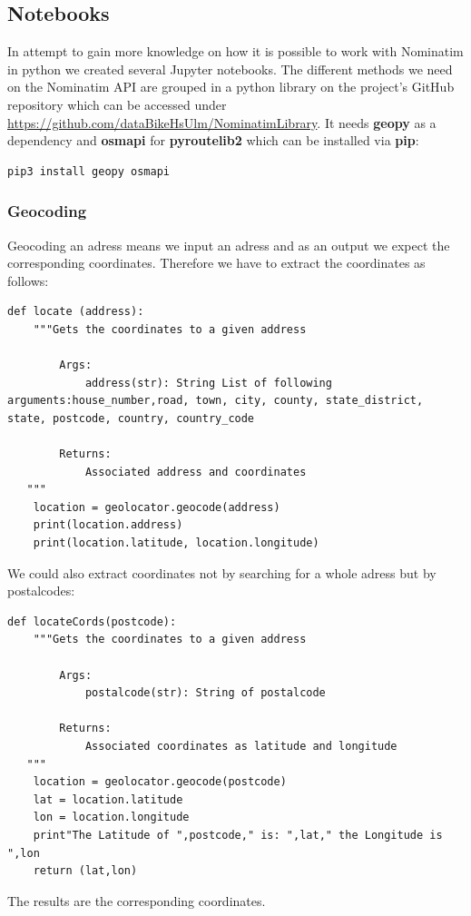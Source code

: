 \subsection{Notebooks}
In attempt to gain more knowledge on how it is possible to work with Nominatim in python we created several Jupyter notebooks. The different methods we need on the Nominatim API are grouped in a python library on the project's GitHub repository which can be accessed under\\ \href{https://github.com/dataBikeHsUlm/NominatimLibrary}{https://github.com/dataBikeHsUlm/NominatimLibrary}.
It needs \textbf{geopy} as a dependency and \textbf{osmapi} for \textbf{pyroutelib2} which can be installed via \textbf{pip}:
\begin{lstlisting}[language=bash,breaklines=true]
pip3 install geopy osmapi
\end{lstlisting}
\subsubsection{Geocoding}
Geocoding an adress means we input an adress and as an output we expect the corresponding coordinates. Therefore we have to extract the coordinates as follows:
\begin{lstlisting}[breaklines=true]
def locate (address):
    """Gets the coordinates to a given address
        
        Args: 
            address(str): String List of following arguments:house_number,road, town, city, county, state_district, state, postcode, country, country_code
	        
        Returns: 
            Associated address and coordinates 
   """
    location = geolocator.geocode(address)
    print(location.address)
    print(location.latitude, location.longitude)
\end{lstlisting}
We could also extract coordinates not by searching for a whole adress but by postalcodes:
\begin{lstlisting}[breaklines=true]
def locateCords(postcode):
    """Gets the coordinates to a given address
        
        Args: 
            postalcode(str): String of postalcode
	        
        Returns: 
            Associated coordinates as latitude and longitude
   """
    location = geolocator.geocode(postcode)
    lat = location.latitude
    lon = location.longitude
    print"The Latitude of ",postcode," is: ",lat," the Longitude is ",lon
    return (lat,lon)
\end{lstlisting}
The results are the corresponding coordinates.
